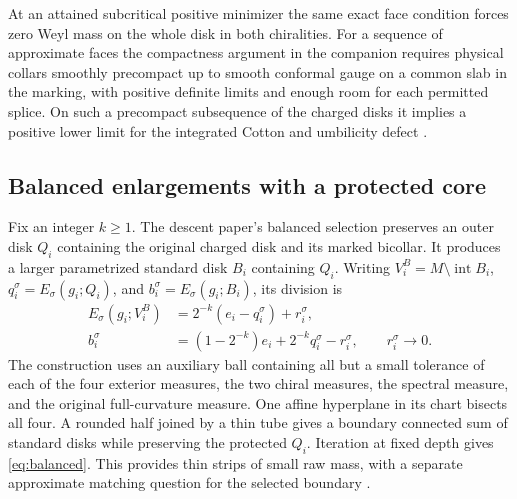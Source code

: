 \documentclass[11pt,letterpaper]{article}
\numberwithin{equation}{section}
\theoremstyle{remark}
\DeclareMathOperator{\intt}{int}
\begin{document}
At an attained subcritical positive minimizer the
same exact face condition forces zero Weyl mass on
the whole disk in both chiralities. For a sequence
of approximate faces the compactness argument in the
companion requires physical collars smoothly
precompact up to smooth conformal gauge on a common
slab in the marking, with positive definite limits
and enough room for each permitted splice. On such
a precompact subsequence of the charged disks it
implies a positive lower limit for the integrated
Cotton and umbilicity defect
\cite{Baker2026CollarDeformation}.

\subsection{Balanced enlargements with a protected core}
Fix an integer \(k\ge1\). The descent paper's balanced
selection preserves an outer disk \(Q_i\) containing
the original charged disk and its marked bicollar.
It produces a larger parametrized standard disk
\(B_i\) containing \(Q_i\).
Writing \(V_i^B=M\setminus\intt B_i\),
\(q_i^\sigma=E_\sigma(g_i;Q_i)\), and
\(b_i^\sigma=E_\sigma(g_i;B_i)\), its division is
\begin{equation}\label{eq:balanced}
 \begin{aligned}
 E_\sigma(g_i;V_i^B)&=2^{-k}(e_i-q_i^\sigma)+r_i^\sigma,\\
 b_i^\sigma&=(1-2^{-k})e_i+2^{-k}q_i^\sigma-r_i^\sigma,
 \qquad r_i^\sigma\longrightarrow0 .
 \end{aligned}
\end{equation}
The construction uses an auxiliary ball containing
all but a small tolerance of each of the four
exterior measures, the two chiral measures, the
spectral measure, and the original full-curvature
measure. One affine hyperplane in its chart
bisects all four. A rounded half joined by a thin
tube gives a boundary connected sum of standard
disks while preserving the protected \(Q_i\).
Iteration at fixed depth gives \eqref{eq:balanced}.
This provides thin strips of small raw mass, with
a separate approximate matching question for the
selected boundary
\cite[Retaining the marked core inside a larger disk]{Baker2026FixedDescent}
\cite{StoneTukey1942Sandwich}.
\end{document}

